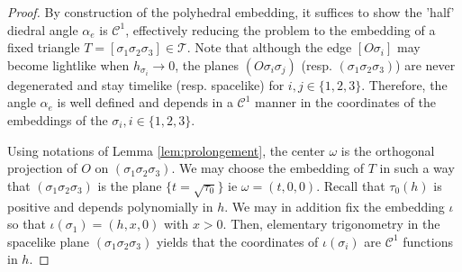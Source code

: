 \documentclass[a4paper,12pt]{article}
\def\TT{\mathcal T}
\theoremstyle{definition}
\begin{document}
                    \begin{proof}
                        By construction of the polyhedral embedding, it suffices to show the 'half' diedral angle $\alpha_e$  is $\mathscr C^1$, effectively reducing the problem to the embedding of a fixed triangle $T=[\sigma_1\sigma_2\sigma_3] \in \TT$. Note that although the edge $[O\sigma_i]$ may become lightlike when $h_{\sigma_i}\rightarrow 0$, the planes $(O\sigma_i\sigma_j)$ (resp. $(\sigma_1\sigma_2\sigma_3)$) are never degenerated and stay timelike (resp. spacelike) for $i,j\in \{1,2,3\}$. Therefore, the angle $\alpha_e$ is well defined and depends in a $\mathscr C^1$ manner in the coordinates of the embeddings of the $\sigma_i, i\in \{1,2,3\}$.
                    
                         Using notations of Lemma \ref{lem:prolongement}, 
                         the center $\omega$ 
                         is the orthogonal projection of $O$ on $(\sigma_1\sigma_2\sigma_3)$. We may choose the embedding of $T$ in such a way that $(\sigma_1\sigma_2\sigma_3)$ is the plane $\{t=\sqrt{\tau_0}\}$ ie $\omega = (t,0,0)$. Recall that $\tau_0(h)$ is positive and depends polynomially  in $h$. We may in addition fix the embedding $\iota$ so that $\iota(\sigma_1) = (h,x,0)$ with $x>0$.  Then, elementary trigonometry in the spacelike plane $(\sigma_1\sigma_2\sigma_3)$ yields that 
                         the coordinates of $\iota(\sigma_i)$ are $\mathscr C^1$  functions in $h$. 
                    \end{proof}
\end{document}
